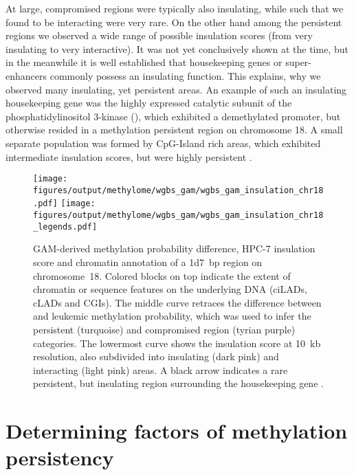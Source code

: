 At large, compromised regions were typically also insulating, while such that we found to be interacting were very rare. On the other hand among the persistent regions we observed a wide range of possible insulation scores (from very insulating to very interactive). It was not yet conclusively shown at the time, but in the meanwhile it is well established that housekeeping genes or super-enhancers commonly possess an insulating function\cite{Hug2017,Flyamer2017}. This explains, why we observed many insulating, yet persistent areas. An example of such an insulating housekeeping gene was the highly expressed catalytic subunit of the phosphatidylinositol 3-kinase (), which exhibited a demethylated promoter, but otherwise resided in a methylation persistent region on chromosome 18. A small separate population was formed by CpG-Island rich areas, which exhibited intermediate insulation scores, but were highly persistent .

\begin{figure}[!htb]
	\centering
	\texttt{[image: figures/output/methylome/wgbs\_gam/wgbs\_gam\_insulation\_chr18.pdf]}
	\texttt{[image: figures/output/methylome/wgbs\_gam/wgbs\_gam\_insulation\_chr18\_legends.pdf]} 
	\caption{GAM-derived methylation probability difference, HPC-7 insulation score and chromatin annotation of a \SI{1d7}{bp} region on chromosome~\num{18}. Colored blocks on top indicate the extent of chromatin or sequence features on the underlying DNA (ciLADs, cLADs and CGIs). The middle curve retraces the difference between \dnmtchip and \dnmtwt \kitpos leukemic methylation probability, which was used to infer the persistent (turquoise) and compromised region (tyrian purple) categories. The lowermost curve shows the insulation score at \SI{10}{\kilo b} resolution, also subdivided into insulating (dark pink) and interacting (light pink) areas. A black arrow indicates a rare persistent, but insulating region surrounding the housekeeping gene .} 
	\label{fig:wgbs_gam_insulation_chr18}
\end{figure}


\section{Determining factors of methylation persistency}
\label{chap:r:persistency:nextcgi}

